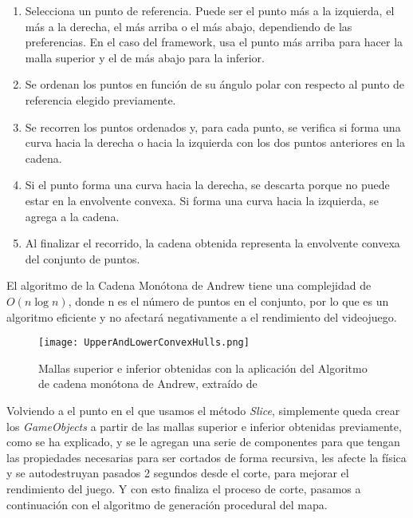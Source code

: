\begin{enumerate}
    \item Selecciona un punto de referencia. Puede ser el punto más a la izquierda, el más a la derecha, el más arriba o el más abajo, dependiendo de las preferencias. En el caso del framework, usa el punto más arriba para hacer la malla superior y el de más abajo para la inferior.
    
    \item Se ordenan los puntos en función de su ángulo polar con respecto al punto de referencia elegido previamente.
    
    \item Se recorren los puntos ordenados y, para cada punto, se verifica si forma una curva hacia la derecha o hacia la izquierda con los dos puntos anteriores en la cadena.
    
    \item Si el punto forma una curva hacia la derecha, se descarta porque no puede estar en la envolvente convexa. Si forma una curva hacia la izquierda, se agrega a la cadena.
    
    \item Al finalizar el recorrido, la cadena obtenida representa la envolvente convexa del conjunto de puntos.
    
\end{enumerate}

El algoritmo de la Cadena Monótona de Andrew tiene una complejidad de $O(n \log n)$, donde n es el número de puntos en el conjunto, por lo que es un algoritmo eficiente y no afectará negativamente a el rendimiento del videojuego.

\begin{figure}[H]
    \centering
    \texttt{[image: UpperAndLowerConvexHulls.png]}
    \caption{Mallas superior e inferior obtenidas con la aplicación del Algoritmo de cadena monótona de Andrew, extraído de \cite{MonotoneChain}}
\end{figure}

Volviendo a el punto en el que usamos el método \textit{Slice}, simplemente queda crear los \textit{GameObjects} a partir de las mallas superior e inferior obtenidas previamente, como se ha explicado, y se le agregan una serie de componentes para que tengan las propiedades necesarias para ser cortados de forma recursiva, les afecte la física y se autodestruyan pasados 2 segundos desde el corte, para mejorar el rendimiento del juego. Y con esto finaliza el proceso de corte, pasamos a continuación con el algoritmo de generación procedural del mapa.


